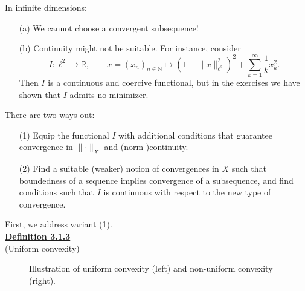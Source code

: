 In infinite dimensions:
\begin{itemize}
	\item[(a)] We cannot choose a convergent subsequence!
	\item[(b)] Continuity might not be suitable. For instance, consider
	\[I:\ell^2\longrightarrow\mathbb{R},\qquad x=(x_n)_{n\in\mathbb{N}}\longmapsto(1-\lVert x\rVert_{\ell^2}^2)^2+\sum_{k=1}^\infty{\frac{1}{k}x_k^2}.\]
	Then $I$ is a continuous and coercive functional, but in the exercises we have shown that $I$ admits no minimizer.\\
\end{itemize}

There are two ways out:
\begin{itemize}
	\item[(1)] Equip the functional $I$ with additional conditions that guarantee convergence in $\lVert\cdot\rVert_X$ and (norm-)continuity.
	\item[(2)] Find a suitable (weaker) notion of convergences in $X$ such that boundedness of a sequence implies convergence of a subsequence, and find conditions such that $I$ is continuous with respect to the new type of convergence.\\
\end{itemize}

First, we address variant (1).\\

\textbf{\underline{Definition 3.1.3}}\\
(Uniform convexity)\\
\begin{figure}[ht]
	\centering
	\caption{Illustration of uniform convexity (left) and non-uniform convexity (right).}
\end{figure}

